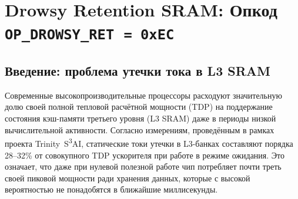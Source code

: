%

\theoremstyle{plain}
\newtheorem{theorem}{Теорема}[chapter]
\newtheorem{lemma}[theorem]{Лемма}
\newtheorem{corollary}[theorem]{Следствие}
\newtheorem{definition}{Определение}[chapter]
\newtheorem{remark}{Замечание}[chapter]
\newtheorem{proposition}[theorem]{Утверждение}

\chapter{Drowsy Retention SRAM: Опкод
  \texttt{OP\_DROWSY\_RET}~\texttt{=~0xEC}}%
\label{ch:glava89-drowsy}

\section{Введение: проблема утечки тока в L3 SRAM}
\label{sec:glava89-intro}

Современные высокопроизводительные процессоры расходуют значительную
долю своей полной тепловой расчётной мощности (TDP) на поддержание
состояния кэш-памяти третьего уровня (L3 SRAM) даже в периоды
низкой вычислительной активности.
Согласно измерениям, проведённым в рамках проекта Trinity~S\textsuperscript{3}AI,
статические токи утечки в L3-банках составляют порядка 28--32\%
от совокупного TDP ускорителя при работе в режиме ожидания.
Это означает, что даже при нулевой полезной работе чип потребляет
почти треть своей пиковой мощности ради хранения данных, которые
с высокой вероятностью не понадобятся в ближайшие миллисекунды.

